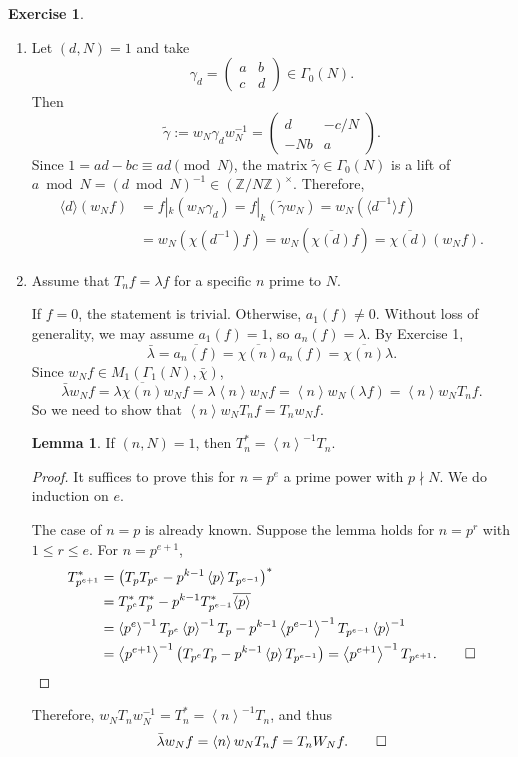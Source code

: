 \documentclass{article}
\theoremstyle{definition}
\newtheorem{example}{Exercise}
\newtheorem{lemma}{Lemma}
\theoremstyle{remark}
\newcommand{\Z}{\mathbb{Z}}
\newcommand{\gene}[1]{\left\langle #1 \right\rangle} %
\begin{document}
\begin{example}
\begin{enumerate}
    \item     
    Let $(d, N) = 1$
    and take \[\gamma_d = \begin{pmatrix}
        a & b \\ c & d
    \end{pmatrix}\in\Gamma_0(N).\]
    Then \[\tilde{\gamma} := w_N\gamma_dw_N^{-1} = \begin{pmatrix}
        d & -c/N \\ -Nb & a
    \end{pmatrix}.\]
    Since $1 = ad - bc \equiv ad \pmod N$,
    the matrix $\tilde\gamma\in\Gamma_0(N)$ is a lift of $a\bmod N = (d\bmod N)^{-1}\in(\Z/N\Z)^\times$.
    Therefore,\begin{align*}
        \langle d\rangle (w_Nf) &= f|_k(w_N\gamma_d) = f|_k(\tilde\gamma w_N)
        = w_N\left(\langle d^{-1}\rangle f\right)
        \\ &= w_N(\chi(d^{-1})f) = w_N(\overline{\chi(d)}f) = \overline{\chi(d)} (w_Nf).
    \end{align*}
    \item Assume that $T_nf = \lambda f$ for a specific $n$ prime to $N$.
    
    If $f = 0$, the statement is trivial.
    Otherwise, $a_1(f)\ne 0$.
    Without loss of generality, we may assume $a_1(f) = 1$,
    so $a_n(f) = \lambda$.
    By Exercise 1, \[\bar{\lambda} = \overline{a_n(f)} = \overline{\chi(n)}a_n(f) = \overline{\chi(n)}\lambda.\]
    Since $w_Nf\in M_1(\Gamma_1(N), \bar{\chi})$,
    \[\bar{\lambda}w_Nf
    = \lambda\overline{\chi(n)} w_Nf
    = \lambda\gene{n}w_Nf
    = \gene{n}w_N(\lambda f) = \gene{n}w_NT_nf.\]
    So we need to show that $\gene{n}w_NT_nf = T_nw_Nf$.
\begin{lemma}
    If $(n, N) = 1$, then $T_n^* = \gene{n}^{-1}T_n$.
\end{lemma}
\begin{proof}
    It suffices to prove this for $n = p^e$ a prime power with $p\nmid N$.
    We do induction on $e$.

    The case of $n = p$ is already known.
    Suppose the lemma holds for $n = p^r$ with $1\le r\le e$.
    For $n = p^{e + 1}$,\begin{align*}
        T_{p^{e+1}}^* &= \left(T_pT_{p^e} - p^{k-1}\gene{p}T_{p^{e-1}}\right)^*\\ &
        = T_{p^e}^*T_p^* - p^{k-1}T_{p^{e-1}}^* \overline{\gene{p}}\\ &
        = \gene{p^e}^{-1}T_{p^e}\gene{p}^{-1}T_p -
        p^{k-1}\gene{p^{e-1}}^{-1}T_{p^{e-1}}\gene{p}^{-1}\\ &
        = \gene{p^{e+1}}^{-1}\left( T_{p^e}T_p - p^{k-1}\gene{p}T_{p^{e-1}} \right) = \gene{p^{e+1}}^{-1}T_{p^{e+1}}.\qedhere
    \end{align*}    
\end{proof}
Therefore, $w_NT_nw_N^{-1} = T_n^* = \gene{n}^{-1}T_n$, and thus \[\bar{\lambda}w_Nf = \gene{n}w_NT_nf = T_nW_Nf.\qedhere\]



\end{enumerate}
\end{example}
\end{document}
